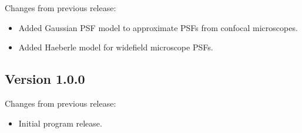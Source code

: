 \documentclass[11pt,titlepage,twoside]{article}
\begin{document}
\noindent
Changes from previous release:
\begin{itemize}
\item Added Gaussian PSF model to approximate PSFs from confocal microscopes.
\item Added Haeberle model for widefield microscope PSFs. 
\end{itemize}

\subsection{Version 1.0.0}

\noindent
Changes from previous release:
\begin{itemize}
\item Initial program release.
\end{itemize}




\end{document}
